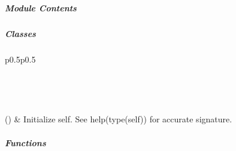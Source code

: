 \documentclass[letterpaper,10pt,english]{sphinxmanual}
\begin{document}
\subparagraph{Module Contents}
\label{\detokenize{autoapi/pine/backend/data/service/index:module-contents}}

\subparagraph{Classes}
\label{\detokenize{autoapi/pine/backend/data/service/index:classes}}

\begin{savenotes}\sphinxatlongtablestart\begin{longtable}[c]{p{0.5\linewidth}p{0.5\linewidth}}
\hline

\endfirsthead

%
{}\\
\hline

\endhead

\hline
{}\\
\endfoot

\endlastfoot

{\hyperref[\detokenize{autoapi/pine/backend/data/service/index:pine.backend.data.service.PerformanceHistory}]{}}()
&
Initialize self.  See help(type(self)) for accurate signature.
\\
\hline
\end{longtable}\sphinxatlongtableend\end{savenotes}


\subparagraph{Functions}
\label{\detokenize{autoapi/pine/backend/data/service/index:functions}}
\end{document}
